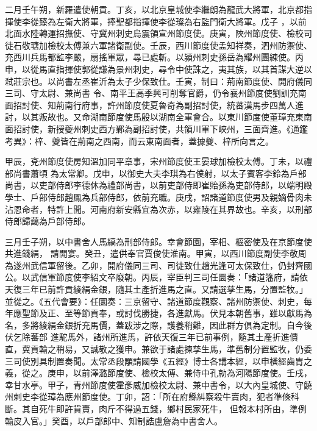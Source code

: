 \begin{pinyinscope}
 二月壬午朔，新羅遣使朝貢。丁亥，以北京皇城使李繼朗為龍武大將軍，北京都指揮使李從臻為左衛大將軍，捧聖都指揮使李從璨為右監門衛大將軍。戊子
 ，以前北面水陸轉運招撫使、守冀州刺史烏震領宣州節度使。庚寅，陜州節度使、檢校司徒石敬瑭加檢校太傅兼六軍諸衛副使。壬辰，西川節度使孟知祥奏，泗州防禦使、充西川兵馬都監李嚴，扇搖軍眾，尋已處斬。以潁州刺史孫岳為耀州團練使。丙申，以從馬直指揮使郭從謙為景州刺史，尋令中使誅之，夷其族，以其首謀大逆以弒莊宗也。以尚書左丞崔沂為太子少保致仕。壬寅，制曰：荊南節度使、開府儀同三司、守太尉、兼尚書
 令、南平王高季興可削奪官爵，仍令襄州節度使劉訓充南面招討使、知荊南行府事，許州節度使夏魯奇為副招討使，統蕃漢馬步四萬人進討，以其叛故也。又命湖南節度使馬殷以湖南全軍會合。以東川節度使董璋充東南面招討使，新授夔州刺史西方鄴為副招討使，共領川軍下峽州，三面齊進。《通鑑考異》：梓、夔皆在荊南之西南，而云東南面者，蓋據夔、梓所向言之。



 甲辰，兗州節度使房知溫加同平章事，宋州節度使王晏球加檢校太傅。丁未，以禮部尚書蕭頃
 為太常卿。戊申，以御史大夫李琪為右僕射，以太子賓客李鈴為戶部尚書，以吏部侍郎李德休為禮部尚書，以前吏部侍即崔貽孫為吏部侍郎，以端明殿學士、戶部侍郎趙鳳為兵部侍郎，依前充職。庚戌，詔諸道節度使男及親嫡骨肉未沾恩命者，特許上聞。河南府新安縣宜為次赤，以雍陵在其界故也。辛亥，以刑部侍郎歸藹為戶部侍郎。



 三月壬子朔，以中書舍人馬縞為刑部侍郎。幸會節園，宰相、樞密使及在京節度使共進錢絹，
 請開宴。癸丑，遣供奉官賈俊使淮南。甲寅，以西川節度副使李敬周為遂州武信軍留後。乙卯，開府儀同三司、司徒致仕趙光逢可太保致仕，仍封齊國公。以武信軍節度使李紹文卒廢朝。丙辰，宰臣判三司任圜奏：「諸道籓府，請依天復三年已前許貢綾絹金銀，隨其土產折進馬之直。又請選孳生馬，分置監牧。」並從之。《五代會要》：任圜奏：三京留守、諸道節度觀察、諸州防禦使、刺史，每年應聖節及正、至等節貢奉，或討伐勝捷，各進獻馬。伏見本朝舊事，雖以獻馬為名，多將綾絹金銀折充馬價，蓋跋涉之際，護養稍難，因此群方俱為定制。自今後伏乞除蕃部
 進駝馬外，諸州所進馬，許依天復三年已前事例，隨其土產折進價直，冀貢輸之稍易，又誠敬之獲申。兼欲于諸處揀孳生馬，準舊制分置監牧，仍委三司使別具制置奏聞。太常丞段顒請國學《五經》博士各講本經，以申橫經齒胄之義，從之。庚申，以前澤潞節度使、檢校太傅、兼侍中孔勍為河陽節度使。壬戌，幸甘水亭。甲子，青州節度使霍彥威加檢校太尉、兼中書令，以大內皇城使、守饒州刺史李從璋為應州節度使。丁卯，詔：「所在府縣糾察殺牛賣肉，犯者準條科斷。其自死牛即許貨賣，肉斤不得過五錢，鄉村民家死牛，
 但報本村所由，準例輸皮入官。」癸酉，以戶部郎中、知制誥盧詹為中書舍人。




\end{pinyinscope}
